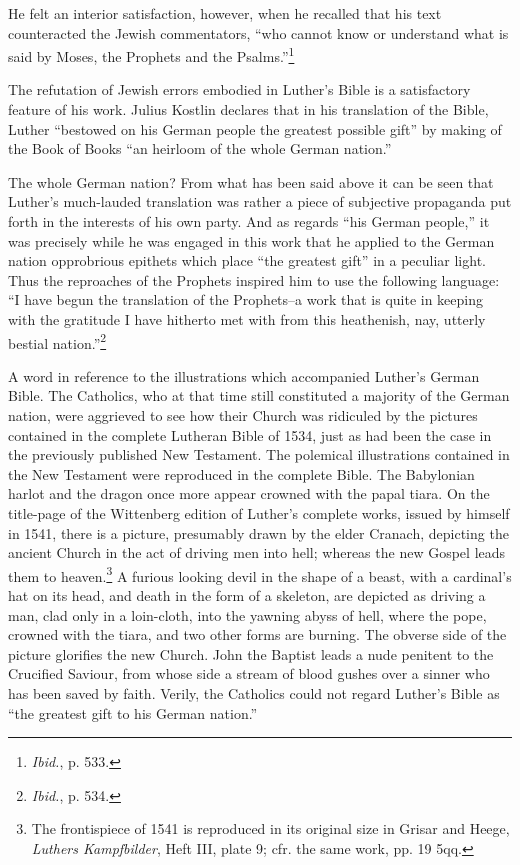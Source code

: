 He felt an interior satisfaction, however, when he recalled that
his text counteracted the Jewish commentators, “who cannot know
or understand what is said by Moses, the Prophets and the Psalms.”\footnote{\textit{Ibid.}, p. 533.}

The refutation of Jewish errors embodied in Luther’s Bible is a
satisfactory feature of his work.
Julius Kostlin declares that in his translation of the Bible, Luther
“bestowed on his German people the greatest possible gift” by making of
the Book of Books “an heirloom of the whole German nation.”

The whole German nation? From what has been said above it can be
seen that Luther’s much-lauded translation was rather a piece of subjective
propaganda put forth in the interests of his own party. And
as regards “his German people,” it was precisely while he was engaged
in this work that he applied to the German nation opprobrious
epithets which place “the greatest gift” in a peculiar light. Thus the
reproaches of the Prophets inspired him to use the following language:
“I have begun the translation of the Prophets--a work that is quite
in keeping with the gratitude I have hitherto met with from this
heathenish, nay, utterly bestial nation.”\footnote{\textit{Ibid.}, p. 534.}

A word in reference to the illustrations which accompanied Luther’s
German Bible. The Catholics, who at that time still constituted a
majority of the German nation, were aggrieved to see how their
Church was ridiculed by the pictures contained in the complete Lutheran
Bible of 1534, just as had been the case in the previously published New
Testament. The polemical illustrations contained in the
New Testament were reproduced in the complete Bible. The Babylonian
harlot and the dragon once more appear crowned with the
papal tiara. On the title-page of the Wittenberg edition of Luther’s
complete works, issued by himself in 1541, there is a picture, presumably
drawn by the elder Cranach, depicting the ancient Church
in the act of driving men into hell; whereas the new Gospel leads
them to heaven.\footnote
{The frontispiece of 1541 is reproduced in its original size in Grisar and Heege,
\textit{Luthers Kampfbilder}, Heft III, plate 9; cfr. the same work, pp. 19 5qq.}
A furious looking devil in the shape of a beast,
with a cardinal’s hat on its head, and death in the form of a skeleton,
are depicted as driving a man, clad only in a loin-cloth, into the yawning
abyss of hell, where the pope, crowned with the tiara, and two
other forms are burning. The obverse side of the picture glorifies the
new Church. John the Baptist leads a nude penitent to the Crucified
Saviour, from whose side a stream of blood gushes over a sinner who
has been saved by faith. Verily, the Catholics could not regard Luther’s
Bible as “the greatest gift to his German nation.”


